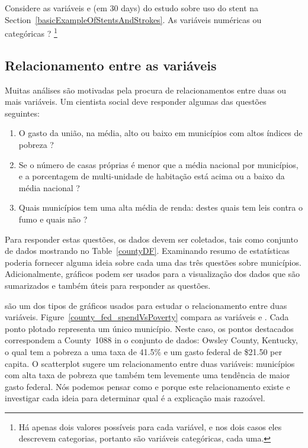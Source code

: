 \begin{exercise} 
Considere as variáveis  e  (em 30 days) do estudo sobre uso do stent na Section~\ref{basicExampleOfStentsAndStrokes}. As variáveis numéricas ou categóricas ? \footnote{Há apenas dois valores possíveis para cada variável, e nos dois casos eles descrevem categorias, portanto são variáveis categóricas, cada uma.}
\end{exercise}

\subsection{Relacionamento entre as variáveis}
\label{variableRelations}

Muitas análises são motivadas pela procura de relacionamentos entre duas ou mais variáveis. Um cientista social deve responder algumas das questões seguintes:
\begin{enumerate}
\setlength{\itemsep}{0mm}
\item[(1)]\label{fedSpendingPovertyQuestion} O gasto da união, na média, alto ou baixo em municípios com altos índices de pobreza ?
\item[(2)]\label{ownershipMultiUnitQuestion} Se o número de casas próprias é menor que a média nacional por municípios, e a porcentagem de multi-unidade de habitação está acima ou a baixo da média nacional ?
\item[(3)]\label{isAverageIncomeAssociatedWithSmokingBans} Quais municípios tem uma alta média de renda: destes quais tem leis contra o fumo e quais não ?
\end{enumerate}

Para responder estas questões, os dados devem ser coletados, tais como  conjunto de dados mostrando no Table~\ref{countyDF}. Examinando resumo de estatísticas   poderia fornecer alguma ideia sobre cada uma das três questões sobre municípios. Adicionalmente, gráficos podem ser usados para a visualização dos dados que são sumarizados e também úteis para responder as questões.

 são um dos tipos de gráficos usados para estudar o relacionamento entre duas variáveis. Figure~\ref{county_fed_spendVsPoverty} compara as variáveis  e . Cada ponto plotado representa um único município. Neste caso, os pontos destacados correspondem a County~1088 in o  conjunto de dados: Owsley County, Kentucky, o qual tem a pobreza a uma taxa de 41.5\% e um gasto federal de \$21.50 per capita. O scatterplot sugere um relacionamento entre duas variáveis: municípios com alta taxa de pobreza que também tem levemente uma tendência de maior gasto federal. Nós podemos pensar como e porque este relacionamento existe e investigar cada ideia para determinar qual é a explicação mais razoável.

